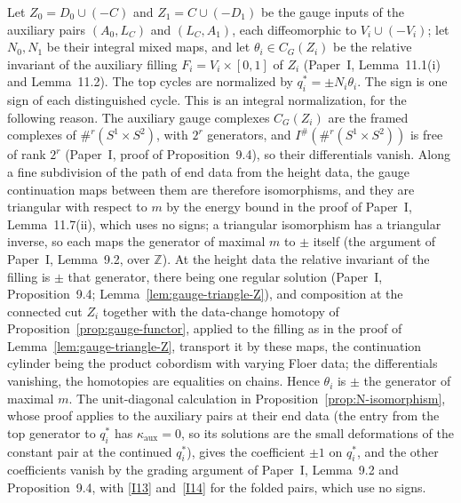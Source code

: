 \documentclass[11pt]{amsart}
\theoremstyle{definition}
\theoremstyle{remark}
\theoremstyle{plain}
\numberwithin{equation}{section}
\newcommand{\ZZ}{\mathbb Z}
\newcommand{\Ish}{I^{\#}}
\begin{document}
Let $Z_0=D_0\cup(-C)$ and $Z_1=C\cup(-D_1)$ be the gauge inputs of the auxiliary pairs $(A_0,L_C)$ and $(L_C,A_1)$, each diffeomorphic to $V_i\cup(-V_i)$; let $N_0,N_1$ be their integral mixed maps, and let $\theta_i\in C_G(Z_i)$ be the relative invariant of the auxiliary filling $F_i=V_i\times[0,1]$ of $Z_i$ (Paper~I, Lemma~11.1(i) and Lemma~11.2). The top cycles are normalized by
$q_i^*=\pm N_i\theta_i$. The sign is one sign
of each distinguished cycle. This is an integral
normalization, for the following reason. The
auxiliary gauge complexes $C_G(Z_i)$ are the
framed complexes of $\#^r(S^1\times S^2)$, with
$2^r$ generators, and $\Ish(\#^r(S^1\times S^2))$
is free of rank $2^r$ \cite[Section~7.8]{Scaduto}
(Paper~I, proof of Proposition~9.4), so their
differentials vanish.
Along a fine subdivision of the path of end data
from the height data, the gauge continuation
maps between them are therefore isomorphisms,
and they are triangular with respect to $m$ by
the energy bound in the proof of Paper~I,
Lemma~11.7(ii), which uses no signs; a
triangular isomorphism has a triangular inverse,
so each maps the generator of maximal $m$ to
$\pm$ itself (the argument of Paper~I,
Lemma~9.2, over $\ZZ$). At the height data the
relative invariant of the filling is $\pm$ that
generator, there being one regular solution
(Paper~I, Proposition~9.4; Lemma~\ref{lem:gauge-triangle-Z}),
and composition at the connected cut $Z_i$
together with the data-change homotopy of
Proposition~\ref{prop:gauge-functor}, applied to
the filling as in the proof of
Lemma~\ref{lem:gauge-triangle-Z}, transport it by
these maps, the continuation cylinder being the
product cobordism with varying Floer data; the
differentials vanishing, the homotopies are
equalities on chains. Hence $\theta_i$ is $\pm$
the generator of maximal $m$. The unit-diagonal
calculation in
Proposition~\ref{prop:N-isomorphism}, whose proof
applies to the auxiliary pairs at their end data
(the entry from the top generator to $q_i^*$ has
$\kappa_{\mathrm{aux}}=0$, so its solutions are
the small deformations of the constant pair at
the continued $q_i^*$), gives the
coefficient $\pm1$ on $q_i^*$, and the other
coefficients vanish by the grading argument of
Paper~I, Lemma~9.2 and Proposition~9.4, with
\ref{I13} and~\ref{I14} for the folded pairs,
which use no signs.
\end{document}

